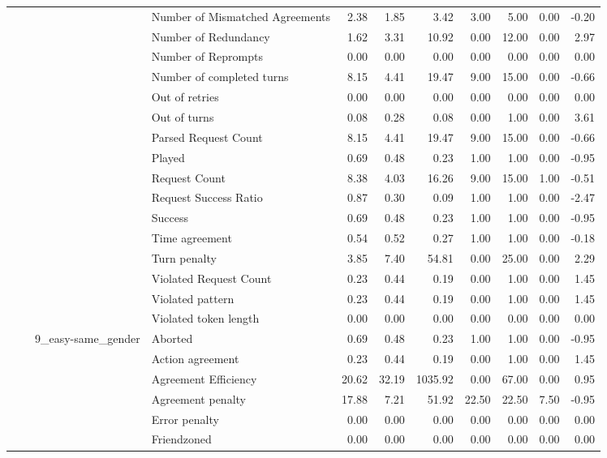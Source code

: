 \begin{tabular}{llllrrrrrrr}
 &  &  & Number of Mismatched Agreements & 2.38 & 1.85 & 3.42 & 3.00 & 5.00 & 0.00 & -0.20 \\
 &  &  & Number of Redundancy & 1.62 & 3.31 & 10.92 & 0.00 & 12.00 & 0.00 & 2.97 \\
 &  &  & Number of Reprompts & 0.00 & 0.00 & 0.00 & 0.00 & 0.00 & 0.00 & 0.00 \\
 &  &  & Number of completed turns & 8.15 & 4.41 & 19.47 & 9.00 & 15.00 & 0.00 & -0.66 \\
 &  &  & Out of retries & 0.00 & 0.00 & 0.00 & 0.00 & 0.00 & 0.00 & 0.00 \\
 &  &  & Out of turns & 0.08 & 0.28 & 0.08 & 0.00 & 1.00 & 0.00 & 3.61 \\
 &  &  & Parsed Request Count & 8.15 & 4.41 & 19.47 & 9.00 & 15.00 & 0.00 & -0.66 \\
 &  &  & Played & 0.69 & 0.48 & 0.23 & 1.00 & 1.00 & 0.00 & -0.95 \\
 &  &  & Request Count & 8.38 & 4.03 & 16.26 & 9.00 & 15.00 & 1.00 & -0.51 \\
 &  &  & Request Success Ratio & 0.87 & 0.30 & 0.09 & 1.00 & 1.00 & 0.00 & -2.47 \\
 &  &  & Success & 0.69 & 0.48 & 0.23 & 1.00 & 1.00 & 0.00 & -0.95 \\
 &  &  & Time agreement & 0.54 & 0.52 & 0.27 & 1.00 & 1.00 & 0.00 & -0.18 \\
 &  &  & Turn penalty & 3.85 & 7.40 & 54.81 & 0.00 & 25.00 & 0.00 & 2.29 \\
 &  &  & Violated Request Count & 0.23 & 0.44 & 0.19 & 0.00 & 1.00 & 0.00 & 1.45 \\
 &  &  & Violated pattern & 0.23 & 0.44 & 0.19 & 0.00 & 1.00 & 0.00 & 1.45 \\
 &  &  & Violated token length & 0.00 & 0.00 & 0.00 & 0.00 & 0.00 & 0.00 & 0.00 \\
\cline{3-11}
 &  & \multirow[t]{27}{*}{9_easy-same_gender} & Aborted & 0.69 & 0.48 & 0.23 & 1.00 & 1.00 & 0.00 & -0.95 \\
 &  &  & Action agreement & 0.23 & 0.44 & 0.19 & 0.00 & 1.00 & 0.00 & 1.45 \\
 &  &  & Agreement Efficiency & 20.62 & 32.19 & 1035.92 & 0.00 & 67.00 & 0.00 & 0.95 \\
 &  &  & Agreement penalty & 17.88 & 7.21 & 51.92 & 22.50 & 22.50 & 7.50 & -0.95 \\
 &  &  & Error penalty & 0.00 & 0.00 & 0.00 & 0.00 & 0.00 & 0.00 & 0.00 \\
 &  &  & Friendzoned & 0.00 & 0.00 & 0.00 & 0.00 & 0.00 & 0.00 & 0.00 \\

\end{tabular}
